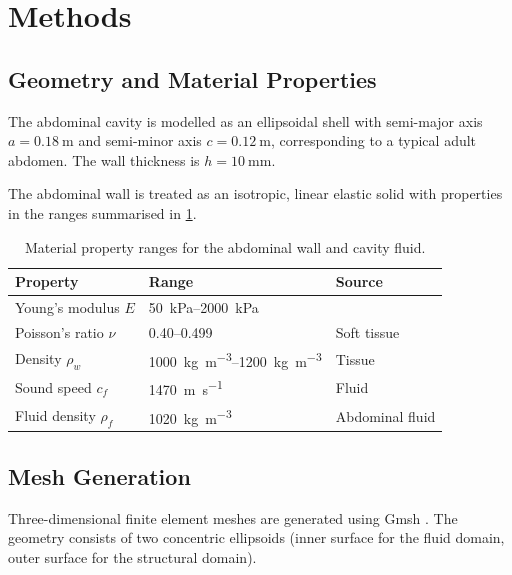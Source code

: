 \section{Methods}
\label{sec:methods}

\subsection{Geometry and Material Properties}

The abdominal cavity is modelled as an ellipsoidal shell with semi-major
axis $a = \SI{0.18}{\metre}$ and semi-minor axis $c = \SI{0.12}{\metre}$,
corresponding to a typical adult abdomen. The wall thickness is
$h = \SI{10}{\milli\metre}$.

The abdominal wall is treated as an isotropic, linear elastic solid with
properties in the ranges summarised in \cref{tab:materials}.

\begin{table}[htbp]
  \centering
  \caption{Material property ranges for the abdominal wall and cavity fluid.}
  \label{tab:materials}
  \begin{tabular}{@{}lll@{}}
    \toprule
    Property & Range & Source \\
    \midrule
    Young's modulus $E$ & \SIrange{50}{2000}{\kilo\pascal} & \citet{Fung1993} \\
    Poisson's ratio $\nu$ & 0.40--0.499 & Soft tissue \\
    Density $\rho_w$ & \SIrange{1000}{1200}{\kilogram\per\cubic\metre} & Tissue \\
    Sound speed $c_f$ & \SI{1470}{\metre\per\second} & Fluid \\
    Fluid density $\rho_f$ & \SI{1020}{\kilogram\per\cubic\metre} & Abdominal fluid \\
    \bottomrule
  \end{tabular}
\end{table}

\subsection{Mesh Generation}

Three-dimensional finite element meshes are generated using Gmsh
\citep{Geuzaine2009}. The geometry consists of two concentric ellipsoids
(inner surface for the fluid domain, outer surface for the structural domain).


